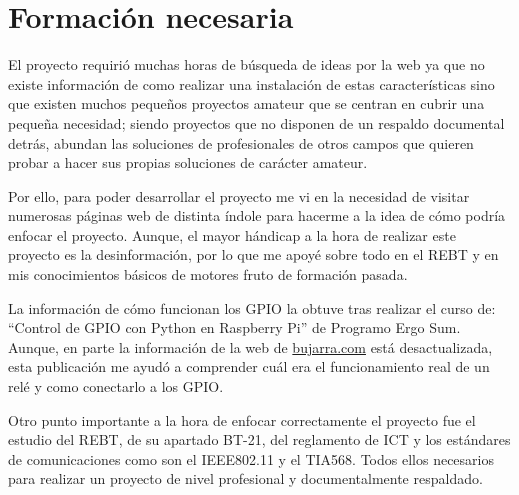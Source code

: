 \section{Formación necesaria}
El proyecto requirió muchas horas de búsqueda de ideas por la web ya que no existe información de como realizar una instalación de estas características sino que existen muchos pequeños proyectos amateur que se centran en cubrir una pequeña necesidad; siendo proyectos que no disponen de un respaldo documental detrás, abundan las soluciones de profesionales de otros campos que quieren probar a hacer sus propias soluciones de carácter amateur.

Por ello, para poder desarrollar el proyecto me vi en la necesidad de visitar numerosas páginas web de distinta índole para hacerme a la idea de cómo podría enfocar el proyecto. Aunque, el mayor hándicap a la hora de realizar este proyecto es la desinformación, por lo que me apoyé sobre todo en el REBT y en mis conocimientos básicos de motores fruto de formación pasada.

La información de cómo funcionan los GPIO la obtuve tras realizar el curso de: “Control de GPIO con Python en Raspberry Pi” de Programo Ergo Sum\cite{inbook:CursoAPES}.
Aunque, en parte la información de la web de \url{bujarra.com}\cite{misc:BujarraGPIO} está desactualizada, esta publicación me ayudó a comprender cuál era el funcionamiento real de un relé y como conectarlo a los GPIO.

Otro punto importante a la hora de enfocar correctamente el proyecto fue el estudio del REBT\cite{manual:REBT}, de su apartado BT-21\cite{manual:ICT-BT-21}, del reglamento de ICT\cite{manual:ICT} y los estándares de comunicaciones como son el IEEE802.11\cite{manual:IEEE802.11} y el TIA568\cite{manual:568.1}\cite{manual:568.2}. Todos ellos necesarios para realizar un proyecto de nivel profesional y documentalmente respaldado.
